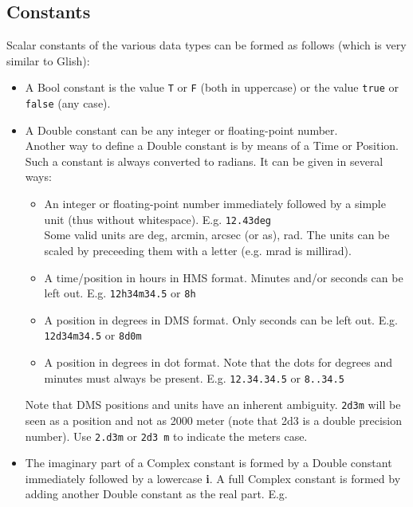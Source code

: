 \subsection{\label{TAQL:CONSTANTS}Constants}
Scalar constants of the various data types can be formed as follows
(which is very similar to Glish):
\begin{itemize}
  \item A Bool constant is the value \texttt{T} or \texttt{F} (both in
  uppercase) or the value \texttt{true} or \texttt{false} (any case).
  \item A Double constant can be any integer or floating-point number.
       \\Another way to define a Double constant is by means of
       a Time or Position. Such a constant is always converted to radians.
      It can be given in several ways:
       \begin{itemize}
         \item An integer or floating-point number immediately
              followed by a simple unit
              (thus without whitespace). E.g. \texttt{12.43deg}
              \\Some valid units are deg, arcmin, arcsec (or as), rad.
              The units can be scaled by preceeding them with a letter
              (e.g. mrad is millirad).
         \item A time/position in hours in HMS format. Minutes and/or
               seconds can be left out.
              E.g. \texttt{12h34m34.5} or \texttt{8h}
         \item A position in degrees in DMS format. Only seconds can be
               left out.
              E.g. \texttt{12d34m34.5} or \texttt{8d0m}
         \item A position in degrees in dot format. Note that the dots
              for degrees and minutes must always be present.
              E.g. \texttt{12.34.34.5} or \texttt{8..34.5}
       \end{itemize}
	Note that DMS positions and units have an inherent
	ambiguity. \texttt{2d3m} will be seen as a position and not
	as 2000 meter (note that 2d3 is a double precision number).
	Use \texttt{2.d3m} or \texttt{2d3 m} to indicate the meters case.
  \item The imaginary part of a Complex constant is formed by a Double
       constant immediately followed by a lowercase \textbf{i}. A full Complex
       constant is formed by adding another Double constant as the
       real part. E.g.
       \begin{verbatim}

\end{verbatim}
\end{itemize}

